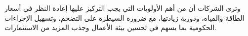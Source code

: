 وترى الشركات أن من أهم الأولويات التي يجب التركيز عليها إعادة النظر في أسعار الطاقة والمياه، ودورية زيادتها، مع ضرورة السيطرة على التضخم، وتسهيل الإجراءات الحكومية بما يسهم في تحسين بيئة الأعمال وجذب المزيد من الاستثمارات.

